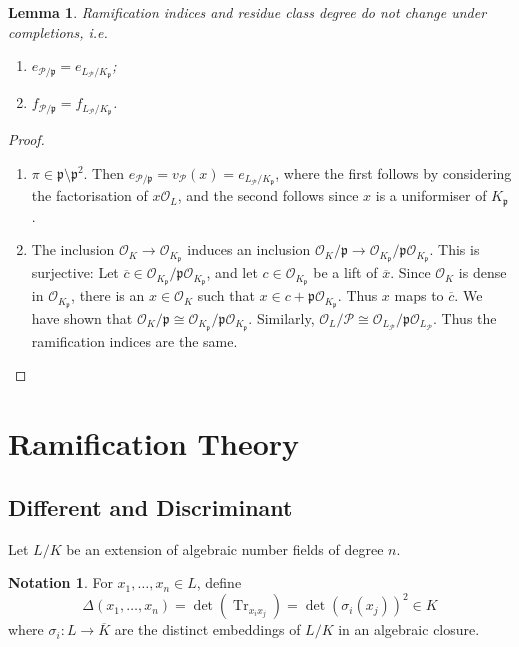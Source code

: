 \documentclass[11pt]{article}
\theoremstyle{definition}
\newtheorem*{notation}{Notation}
\theoremstyle{plain}
\newtheorem*{lemma*}{Lemma}
\theoremstyle{remark}
\DeclareMathOperator{\Tr}{Tr}
\newcommand{\cO}{\mathcal{O}}
\newcommand{\cP}{\mathcal{P}}
\newcommand{\fp}{\mathfrak{p}}
\begin{document}
\begin{lemma*}
    Ramification indices and residue class degree do not change under completions, i.e.
    \begin{enumerate}
        \item $e_{\cP / \fp} = e_{L_\cP / K_\fp}$;
        \item $f_{\cP / \fp} = f_{L_\cP / K_\fp}$.
    \end{enumerate}
\end{lemma*}
\begin{proof}\phantom{}
    \begin{enumerate}
        \item $\pi \in \fp \setminus \fp^2$. Then $e_{\cP / \fp} =v_\cP(x) = e_{L_\cP / K_\fp}$, where the first follows by considering the factorisation of $x \cO_L$, and the second follows since $x$ is a uniformiser of $K_\fp$.

        \item The inclusion $\cO_K \to \cO_{K_\fp}$ induces an inclusion $\cO_K / \fp \to \cO_{K_\fp} / \fp \cO_{K_\fp}$. This is surjective: Let $\overline{c} \in \cO_{K_\fp} / \fp\cO_{K_\fp}$, and let $c \in \cO_{K_\fp}$ be a lift of $\overline{x}$. Since $\cO_K$ is dense in $\cO_{K_\fp}$, there is an $x \in \cO_K$ such that $x \in c + \fp \cO_{K_\fp}$. Thus $x$ maps to $\overline{c}$. We have shown that $\cO_K / \fp \cong \cO_{K_\fp} / \fp \cO_{K_\fp}$. Similarly, $\cO_L / \cP \cong \cO_{L_\cP} / \fp \cO_{L_\cP}$. Thus the ramification indices are the same. \qedhere
    \end{enumerate}
\end{proof}

\section{Ramification Theory}

\subsection{Different and Discriminant}

Let $L / K$ be an extension of algebraic number fields of degree $n$.

\begin{notation}
    For $x_1, \ldots, x_n \in L$, define
    \begin{equation*}
        \Delta(x_1, \ldots, x_n) = \det(\Tr_{x_i x_j}) = \det(\sigma_i(x_j))^2 \in K
    \end{equation*}
    where $\sigma_i : L \to \overline{K}$ are the distinct embeddings of $L/K$ in an algebraic closure.
\end{notation}
\end{document}
